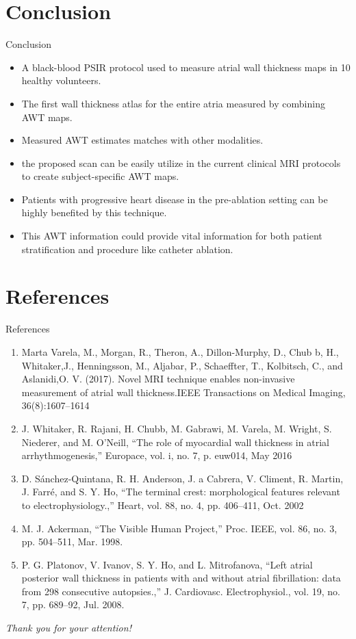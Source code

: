 \documentclass[aspectratio=43]{beamer}
\begin{document}
\section{Conclusion}
\begin{frame}{Conclusion}
\begin{itemize}
\item A black-blood PSIR protocol used to measure atrial wall thickness maps in 10 healthy volunteers. 
\item The first wall thickness atlas for the entire atria measured by combining AWT maps.
\item Measured AWT estimates matches with other modalities.
\item the proposed scan can be easily utilize in the current clinical MRI protocols to create subject-specific AWT maps.
 \item Patients with progressive heart disease in the pre-ablation setting can be highly benefited by this technique. 
 \item This AWT information could provide vital information for both patient stratification and procedure like catheter ablation.
 
\end{itemize}
\end{frame}

\newpage
\section{References}
\begin{frame}{References}
\begin{enumerate}\scriptsize
\item Marta Varela, M., Morgan, R., Theron, A., Dillon-Murphy, D., Chub
b, H., Whitaker,J., Henningsson, M., Aljabar, P., Schaeffter, T., Kolbitsch, C., and Aslanidi,O. V. (2017). Novel MRI technique enables non-invasive measurement of atrial wall thickness.IEEE Transactions on Medical Imaging, 36(8):1607–1614
\item J. Whitaker, R. Rajani, H. Chubb, M. Gabrawi, M. Varela, M. Wright, S. Niederer, and M. O’Neill, “The role of myocardial wall thickness in atrial arrhythmogenesis,” Europace, vol. i, no. 7, p. euw014, May 2016
\item D. Sánchez-Quintana, R. H. Anderson, J. a Cabrera, V. Climent, R. Martin, J. Farré, and S. Y. Ho, “The terminal crest: morphological features relevant to electrophysiology.,” Heart, vol. 88, no. 4, pp. 406–411, Oct. 2002
\item M. J. Ackerman, “The Visible Human Project,” Proc. IEEE, vol. 86, no. 3, pp. 504–511, Mar. 1998.
\item P. G. Platonov, V. Ivanov, S. Y. Ho, and L. Mitrofanova, “Left atrial posterior wall thickness in patients with and without atrial fibrillation: data from 298 consecutive autopsies.,” J. Cardiovasc. Electrophysiol., vol. 19, no. 7, pp. 689–92, Jul. 2008.

\end{enumerate}
\end{frame}


\begin{frame}{}
  \centering \LARGE
  \emph{Thank you for your attention!}
\end{frame}
\end{document}
